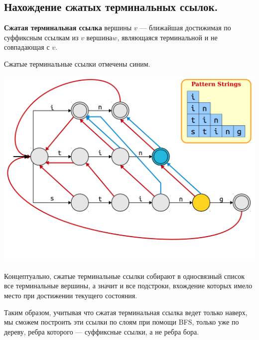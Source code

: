 \subsection{Нахождение сжатых терминальных ссылок.}
\begin{Def}
    \textbf{Сжатая терминальная ссылка} вершины $v$ --- ближайшая достижимая по суффиксным ссылкам из $v$ вершина$w$, являющаяся терминальной и не совпадающая с $v$.
\end{Def}

\begin{example} 

Сжатые терминальные ссылки отмечены синим.
\begin{center}
\includegraphics[scale = 0.3]{"images/lect06/Aho-Corasick-complete-links.png"}
\end{center}
\end{example}

Концептуально, сжатые терминальные ссылки собирают в односвязный список все терминальные вершины, а значит и все подстроки, вхождение которых имело место при достижении текущего состояния.

Таким образом, учитывая что сжатая терминальная ссылка ведет только наверх, мы сможем построить эти ссылки по слоям при помощи BFS, только уже по дереву, ребра которого --- суффиксные ссылки, а не ребра бора.

